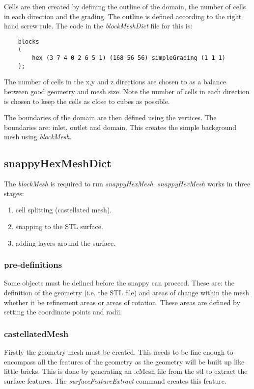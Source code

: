 \documentclass{article}
\begin{document}
	Cells are then created by defining the outline of the domain, the number of cells in each direction and the grading. The outline is defined according to the right hand screw rule. The code in the \textit{blockMeshDict} file for this is:
	\begin{lstlisting}
	blocks
	(
		hex (3 7 4 0 2 6 5 1) (168 56 56) simpleGrading (1 1 1)
	);\end{lstlisting}
	
	The number of cells in the x,y and z directions are chosen to as a balance between good geometry and mesh size. Note the number of cells in each direction is chosen to keep the cells as close to cubes as possible.  
	
	The boundaries of the domain are then defined using the vertices. The boundaries are: inlet, outlet and domain. This creates the simple background mesh using \textit{blockMesh}.
	
	\subsection{snappyHexMeshDict}
	The \textit{blockMesh} is required to run \textit{snappyHexMesh}. \textit{snappyHexMesh} works in three stages:
	\begin{enumerate}
		\item cell splitting (castellated mesh).
		\item snapping to the STL surface.
		\item adding layers around the surface.
	\end{enumerate}
	\subsubsection{pre-definitions}
	Some objects must be defined before the snappy can proceed. These are: the definition of the geometry (i.e. the STL file) and areas of change within the mesh whether it be refinement areas or areas of rotation. These areas are defined by setting the coordinate points and radii.
	\subsubsection{castellatedMesh}
	Firstly the geometry mesh must be created. This needs to be fine enough to encompass all the features of the geometry as the geometry will be built up like little bricks. This is done by generating an .eMesh file from the stl to extract the surface features. The \textit{surfaceFeatureExtract} command creates this feature.
\end{document}
